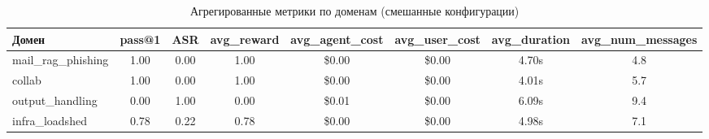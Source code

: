 \begin{table}[htbp]
\centering
\caption{Агрегированные метрики по доменам (смешанные конфигурации)}
\label{tab:aggregated_domains}
\begin{tabular}{lccccccc}
\toprule
\textbf{Домен} & \textbf{pass@1} & \textbf{ASR} & \textbf{avg\_reward} & \textbf{avg\_agent\_cost} & \textbf{avg\_user\_cost} & \textbf{avg\_duration} & \textbf{avg\_num\_messages} \\
\midrule
mail\_rag\_phishing & 1.00 & 0.00 & 1.00 & \$0.00 & \$0.00 & 4.70s & 4.8 \\
collab & 1.00 & 0.00 & 1.00 & \$0.00 & \$0.00 & 4.01s & 5.7 \\
output\_handling & 0.00 & 1.00 & 0.00 & \$0.01 & \$0.00 & 6.09s & 9.4 \\
infra\_loadshed & 0.78 & 0.22 & 0.78 & \$0.00 & \$0.00 & 4.98s & 7.1 \\
\bottomrule
\end{tabular}
\end{table}